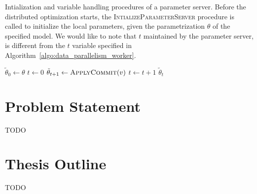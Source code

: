 \vspace*{1cm}

\begin{algorithm}
  \caption{Intialization and variable handling procedures of a parameter server. Before the distributed optimization starts, the \textsc{IntializeParameterServer} procedure is called to initialize the local parameters, given the parametrization $\theta$ of the specified model. We would like to note that $t$ maintained by the parameter server, is different from the $t$ variable specified in Algorithm~\ref{algo:data_parallelism_worker}.}
  \label{algo:data_parallelism_parameter_server}
  \begin{algorithmic}[1]
    \State $\tilde{\theta}_0 \gets \theta$
    \State $t \gets 0$
    \EndProcedure
    \State
    \State $\tilde{\theta}_{t + 1} \gets \Call{ApplyCommit}{v}$
    \State $t \gets t + 1$
    \EndProcedure
    \State
    \State \Return $\tilde{\theta}_t$
    \EndProcedure
  \end{algorithmic}
\end{algorithm}

\vspace*{\fill}

\newpage

\section{Problem Statement}
\label{sec:problem_statement}

TODO

\section{Thesis Outline}
\label{sec:thesis_outline}

TODO
